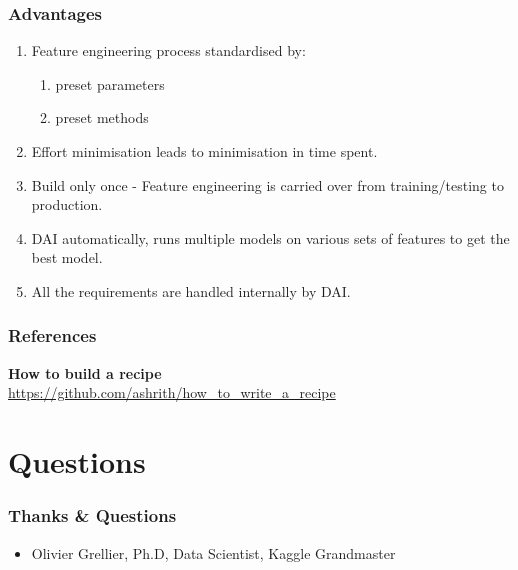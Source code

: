 \documentclass[11pt,
aspectratio=169,
hyperref={colorlinks}
]{beamer}
\begin{document}
\begin{frame}
        \frametitle{Advantages}
        \begin{enumerate}
                \item Feature engineering process standardised by:
                        \begin{enumerate}
                                \item preset parameters
                                \item preset methods
                        \end{enumerate}
                \item Effort minimisation leads to minimisation in time spent.
                \item Build only once - Feature engineering is carried over from training/testing to production.
                \item DAI automatically, runs multiple models on various sets of features to get the best model. 
                \item All the requirements are handled internally by DAI. 
        \end{enumerate}
\end{frame}

\begin{frame}[t, allowframebreaks]

        \frametitle{References}	

        \textbf{How to build a recipe}\\
        \small{\url{https://github.com/ashrith/how_to_write_a_recipe}}

        \framebreak		

        \printbibliography

\end{frame}
\section{Questions}

\begin{frame}

        \frametitle{Thanks \& Questions}
        \begin{itemize}
                \item Olivier Grellier, Ph.D, Data Scientist, Kaggle Grandmaster
        \end{itemize}

\end{frame}

\end{document}
